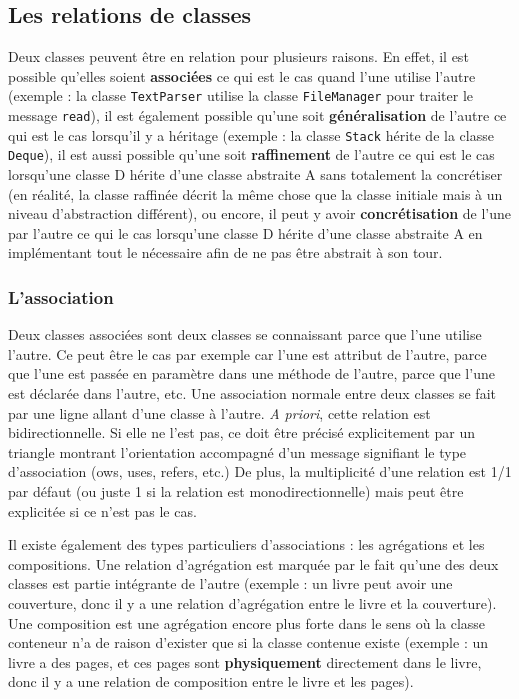 \documentclass{article}
\begin{document}
	\subsection{Les relations de classes}
		Deux classes peuvent être en relation pour plusieurs raisons. En effet, il est possible qu'elles soient \textbf{associées} ce qui est le cas quand l'une utilise l'autre (exemple :
		la classe \texttt{TextParser} utilise la classe \texttt{FileManager} pour traiter le message \texttt{read}), il est également possible qu'une soit \textbf{généralisation} de
		l'autre ce qui est le cas lorsqu'il y a héritage (exemple : la classe \texttt{Stack} hérite de la classe \texttt{Deque}), il est aussi possible qu'une soit \textbf{raffinement}
		de l'autre ce qui est le cas lorsqu'une classe D hérite d'une classe abstraite A sans totalement la concrétiser (en réalité, la classe raffinée décrit la même chose que la classe
		initiale mais à un niveau d'abstraction différent), ou encore, il peut y avoir \textbf{concrétisation} de l'une par l'autre ce qui le cas lorsqu'une classe D hérite d'une classe
		abstraite A en implémentant tout le nécessaire afin de ne pas être abstrait à son tour.

		\subsubsection{L'association}
			Deux classes associées sont deux classes se connaissant parce que l'une utilise l'autre. Ce peut être le cas par exemple car l'une est attribut de l'autre, parce que l'une
			est passée en paramètre dans une méthode de l'autre, parce que l'une est déclarée dans l'autre, etc. Une association normale entre deux classes se fait par une ligne allant d'une classe à
			l'autre. \textit{A priori}, cette relation est bidirectionnelle. Si elle ne l'est pas, ce doit être précisé explicitement par un triangle montrant l'orientation accompagné d'un
			message signifiant le type d'association (ows, uses, refers, etc.) De plus, la multiplicité d'une relation est 1/1 par défaut (ou juste 1 si la relation est monodirectionnelle)
			mais peut être explicitée si ce n'est pas le cas.

			Il existe également des types particuliers d'associations : les agrégations et les compositions. Une relation d'agrégation est marquée par le fait qu'une des deux classes est
			partie intégrante de l'autre (exemple : un livre peut avoir une couverture, donc il y a une relation d'agrégation entre le livre et la couverture). Une composition est une agrégation
			encore plus forte dans le sens où la classe conteneur n'a de raison d'exister que si la classe contenue existe (exemple : un livre a des pages, et ces pages sont \textbf{physiquement}
			directement dans le livre, donc il y a une relation de composition entre le livre et les pages).
\end{document}
